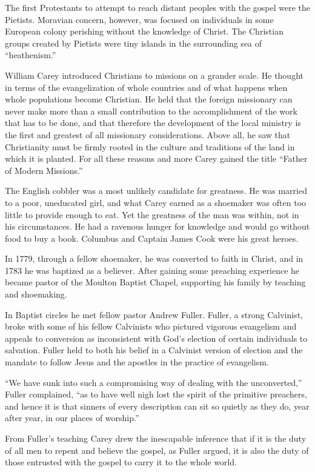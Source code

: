 The first Protestants to attempt to reach distant peoples with the gospel were the Pietists.
Moravian concern, however, was focused on individuals in some European colony perishing without the
knowledge of Christ. The Christian groups created by Pietists were tiny islands in the surrounding
sea of “heathenism.”

William Carey introduced Christians to missions on a grander scale. He thought in terms of the
evangelization of whole countries and of what happens when whole populations become Christian. He
held that the foreign missionary can never make more than a small contribution to the accomplishment
of the work that has to be done, and that therefore the development of the local ministry is the
first and greatest of all missionary considerations. Above all, he saw that Christianity must be
firmly rooted in the culture and traditions of the land in which it is planted. For all these
reasons and more Carey gained the title “Father of Modern Missions.”

The English cobbler was a most unlikely candidate for greatness. He was married to a poor,
uneducated girl, and what Carey earned as a shoemaker was often too little to provide enough to eat.
Yet the greatness of the man was within, not in his circumstances. He had a ravenous hunger for
knowledge and would go without food to buy a book. Columbus and Captain James Cook were his great
heroes.

In 1779, through a fellow shoemaker, he was converted to faith in Christ, and in 1783 he was
baptized as a believer. After gaining some preaching experience he became pastor of the Moulton
Baptist Chapel, supporting his family by teaching and shoemaking.

In Baptist circles he met fellow pastor Andrew Fuller. Fuller, a strong Calvinist, broke with some
of his fellow Calvinists who pictured vigorous evangelism and appeals to conversion as inconsistent
with God’s election of certain individuals to salvation. Fuller held to both his belief in a
Calvinist version of election and the mandate to follow Jesus and the apostles in the practice of
evangelism.

“We have sunk into such a compromising way of dealing with the unconverted,” Fuller complained, “as
to have well nigh lost the spirit of the primitive preachers, and hence it is that sinners of every
description can sit so quietly as they do, year after year, in our places of worship.”

From Fuller’s teaching Carey drew the inescapable inference that if it is the duty of all men to
repent and believe the gospel, as Fuller argued, it is also the duty of those entrusted with the
gospel to carry it to the whole world.

